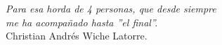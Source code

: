 \documentclass[\main/main.tex]{subfiles}
\begin{document}
\begin{titlepage}
	\nonumber
	\null{}
	\begin{flushright}
		\textit{
			Para esa horda de 4 personas, que desde siempre\\me ha acompañado hasta ''el final''.
			}\\[5mm]
			Christian Andrés Wiche Latorre.
	\end{flushright}
	\null
\end{titlepage}
\end{document}
